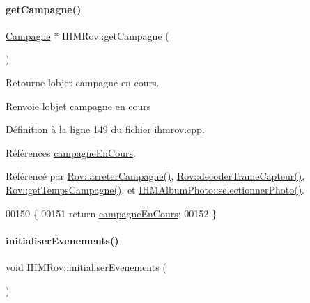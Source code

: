 \paragraph{\texorpdfstring{get\+Campagne()}{getCampagne()}}
{\footnotesize\ttfamily \hyperlink{class_campagne}{Campagne} $\ast$ I\+H\+M\+Rov\+::get\+Campagne (\begin{DoxyParamCaption}{ }\end{DoxyParamCaption})}



Retourne l\textquotesingle{}objet campagne en cours. 

\begin{DoxyReturn}{Renvoie}
l\textquotesingle{}objet campagne en cours 
\end{DoxyReturn}


Définition à la ligne \hyperlink{ihmrov_8cpp_source_l00149}{149} du fichier \hyperlink{ihmrov_8cpp_source}{ihmrov.\+cpp}.



Références \hyperlink{ihmrov_8h_source_l00045}{campagne\+En\+Cours}.



Référencé par \hyperlink{rov_8cpp_source_l00136}{Rov\+::arreter\+Campagne()}, \hyperlink{rov_8cpp_source_l00086}{Rov\+::decoder\+Trame\+Capteur()}, \hyperlink{rov_8cpp_source_l00154}{Rov\+::get\+Temps\+Campagne()}, et \hyperlink{ihmalbumphoto_8cpp_source_l00081}{I\+H\+M\+Album\+Photo\+::selectionner\+Photo()}.


\begin{DoxyCode}
00150 \{
00151     \textcolor{keywordflow}{return} \hyperlink{class_i_h_m_rov_af0475e935531b7331f097ae13d07989b}{campagneEnCours};
00152 \}
\end{DoxyCode}
\mbox{\label{class_i_h_m_rov_a61e34efc084bba9934bce0d91448ea04}} 
\paragraph{\texorpdfstring{initialiser\+Evenements()}{initialiserEvenements()}}
{\footnotesize\ttfamily void I\+H\+M\+Rov\+::initialiser\+Evenements (\begin{DoxyParamCaption}{ }\end{DoxyParamCaption})\hspace{0.3cm}{\ttfamily [private]}}



